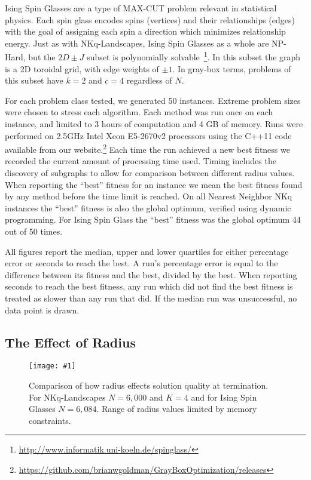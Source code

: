 \documentclass{sig-alternate}
\newcommand{\includegraphicswide}[1]
{\texttt{[image: \#1]}}
\begin{document}
Ising Spin Glasses are a type of MAX-CUT problem relevant in statistical physics. Each spin glass
encodes spins (vertices) and their relationships (edges) with the goal of assigning each spin a direction
which minimizes relationship energy. Just as with NKq-Landscapes, Ising Spin Glasses as a whole
are NP-Hard, but the $2D\pm J$ subset is polynomially solvable~\cite{saul:1994:spinglass}\footnote{\url{http://www.informatik.uni-koeln.de/spinglass/}}. In this
subset the graph is a 2D toroidal grid, with edge weights of $\pm 1$. In gray-box terms,
problems of this subset have $k=2$ and $c=4$ regardless of $N$.

For each problem class tested, we generated 50 instances.
Extreme problem sizes were chosen to stress each algorithm.
Each method was run once on each instance, and limited to 3 hours of computation and 4 GB of memory.
Runs were performed on 2.5GHz Intel Xeon E5-2670v2 processors using the C++11 code available
from our website.\footnote{\url{https://github.com/brianwgoldman/GrayBoxOptimization/releases}}
Each time the run achieved a new best fitness we recorded the current amount of processing time used.
Timing includes the discovery of subgraphs to allow for comparison between different radius values.
When reporting the ``best'' fitness for an instance we mean the best fitness found by any method before
the time limit is reached. On all Nearest Neighbor NKq instances the ``best'' fitness
is also the global optimum, verified using dynamic programming. For Ising Spin Glass the ``best'' fitness
was the global optimum 44 out of 50 times.

All figures report the median, upper and lower quartiles for either percentage error or seconds to reach the best. A run's percentage error is
equal to the difference between its fitness and the best, divided by the best. When reporting seconds
to reach the best fitness, any run which did not find the best fitness is treated as slower than any run that did.
If the median run was unsuccessful, no data point is drawn.

\subsection{The Effect of Radius}
\label{sec-radius}
\begin{figure*}
  \centering
  \includegraphicswide{fitness}
  \caption{Comparison of how radius effects solution quality at termination. For NKq-Landscapes $N=6,000$ and $K=4$ and
  for Ising Spin Glasses $N=6,084$. Range of radius values limited by memory constraints.}
  \label{fig-fitness}
\end{figure*}
\end{document}
